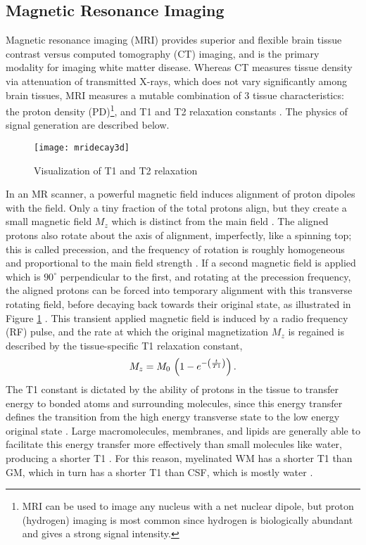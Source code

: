 \subsection{Magnetic Resonance Imaging}
Magnetic resonance imaging (MRI) provides superior and flexible brain tissue contrast versus computed tomography (CT) imaging, and is the primary modality for imaging white matter disease. Whereas CT measures tissue density via attenuation of transmitted X-rays, which does not vary significantly among brain tissues, MRI measures a mutable combination of 3 tissue characteristics: the proton density (PD)\footnote{MRI can be used to image any nucleus with a net nuclear dipole, but proton (hydrogen) imaging is most common since hydrogen is biologically abundant and gives a strong signal intensity.}, and T1 and T2 relaxation constants \cite{Pooley2005}. The physics of signal generation are described below.
\par
\begin{figure}[b]
  \centering\texttt{[image: mridecay3d]}
  \caption{Visualization of T1 and T2 relaxation}
  \label{fig:mridecay3d}
\end{figure}
In an MR scanner, a powerful magnetic field induces alignment of proton dipoles with the field. Only a tiny fraction of the total protons align, but they create a small magnetic field $M_z$ which is distinct from the main field \cite{Bloch1946}. The aligned protons also rotate about the axis of alignment, imperfectly, like a spinning top; this is called precession, and the frequency of rotation is roughly homogeneous and proportional to the main field strength \cite{Bloch1946}. If a second magnetic field is applied which is $90^{\circ}$ perpendicular to the first, and rotating at the precession frequency, the aligned protons can be forced into temporary alignment with this transverse rotating field, before decaying back towards their original state, as illustrated in Figure \ref{fig:mridecay3d} \cite{Bloch1946}. This transient applied magnetic field is induced by a radio frequency (RF) pulse, and the rate at which the original magnetization $M_z$ is regained is described by the tissue-specific T1 relaxation constant,
\begin{equation}
M_z = M_0\thinspace\left(1-e^{-\left(\frac{t}{T1}\right)}\right)\label{eq:T1}.
\end{equation}
The T1 constant is dictated by the ability of protons in the tissue to transfer energy to bonded atoms and surrounding molecules, since this energy transfer defines the transition from the high energy transverse state to the low energy original state \cite{Bloch1946,Bryant2005}. Large macromolecules, membranes, and lipids are generally able to facilitate this energy transfer more effectively than small molecules like water, producing a shorter T1 \cite{Koenig1990}. For this reason, myelinated WM has a shorter T1 than GM, which in turn has a shorter T1 than CSF, which is mostly water \cite{Roberts2007}.
